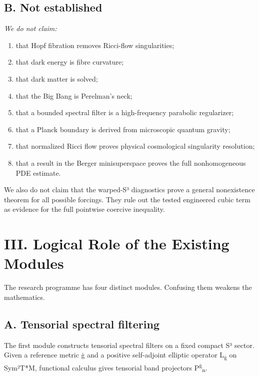 \documentclass[
]{article}
\begin{document}
\subsection{B. Not established}\label{b.-not-established}

\emph{We do not claim:}

\begin{enumerate}
\def\labelenumi{(\arabic{enumi})}
\setcounter{enumi}{8}
\item
  that Hopf fibration removes Ricci-flow singularities;
\item
  that dark energy is fibre curvature;
\item
  that dark matter is solved;
\item
  that the Big Bang is Perelman's neck;
\item
  that a bounded spectral filter is a high-frequency parabolic regularizer;
\item
  that a Planck boundary is derived from microscopic quantum gravity;
\item
  that normalized Ricci flow proves physical cosmological singularity resolution;
\item
  that a result in the Berger minisuperspace proves the full nonhomogeneous PDE estimate.
\end{enumerate}

We also do not claim that the warped-S³ diagnostics prove a general nonexistence theorem for all possible forcings. They rule out the tested engineered cubic term as evidence for the full pointwise coercive inequality.

\section{III. Logical Role of the Existing Modules}\label{iii.-logical-role-of-the-existing-modules}

The research programme has four distinct modules. Confusing them weakens the mathematics.

\subsection{A. Tensorial spectral filtering}\label{a.-tensorial-spectral-filtering}

The first module constructs tensorial spectral filters on a fixed compact S³ sector. Given a reference metric ġ and a positive self-adjoint elliptic operator L\textsubscript{ġ} on Sym²T*M, functional calculus gives tensorial band projectors P\textsuperscript{ġ}\textsubscript{n}.
\end{document}
